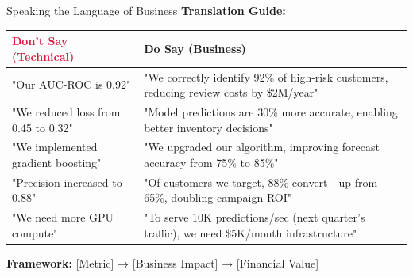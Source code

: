 \begin{frame}{Speaking the Language of Business}
\textbf{Translation Guide:}
\begin{table}
\centering
\small
\begin{tabular}{p{4cm}p{6.5cm}}
\toprule
\textcolor{crimson}{\textbf{Don't Say (Technical)}} & \textcolor{forest}{\textbf{Do Say (Business)}} \\
\midrule
"Our AUC-ROC is 0.92" & "We correctly identify 92\% of high-risk customers, reducing review costs by \$2M/year" \\
\midrule
"We reduced loss from 0.45 to 0.32" & "Model predictions are 30\% more accurate, enabling better inventory decisions" \\
\midrule
"We implemented gradient boosting" & "We upgraded our algorithm, improving forecast accuracy from 75\% to 85\%" \\
\midrule
"Precision increased to 0.88" & "Of customers we target, 88\% convert—up from 65\%, doubling campaign ROI" \\
\midrule
"We need more GPU compute" & "To serve 10K predictions/sec (next quarter's traffic), we need \$5K/month infrastructure" \\
\bottomrule
\end{tabular}
\end{table}

\vspace{0.2cm}
\textbf{Framework:} [Metric] → [Business Impact] → [Financial Value]
\end{frame}

